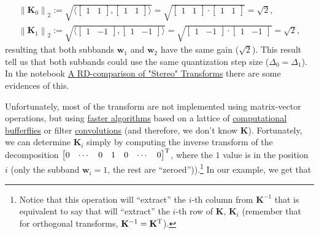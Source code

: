 \begin{equation}
  \begin{array}{l}
    \left\| {\mathbf K}_0 \right\|_2 := \sqrt{\langle \begin{bmatrix}1 & 1\end{bmatrix}, \begin{bmatrix}1 & 1\end{bmatrix} \rangle} = \sqrt{\begin{bmatrix}1 & 1\end{bmatrix} \cdot \begin{bmatrix}1 & 1\end{bmatrix}} = \sqrt{2},\\
    \left\| {\mathbf K}_1 \right\|_2 := \sqrt{\langle \begin{bmatrix}1 & -1\end{bmatrix}, \begin{bmatrix}1 & -1\end{bmatrix} \rangle} = \sqrt{\begin{bmatrix}1 & -1\end{bmatrix}\cdot \begin{bmatrix}1 & -1\end{bmatrix}} = \sqrt{2},
  \end{array}
\end{equation}
resulting that both subbands ${\mathbf w}_1$ and ${\mathbf w}_2$ have
the same gain ($\sqrt{2}$). This result tell us that both subbands
could use the same quantization step size ($\Delta_0=\Delta_1$). In
the notebook
\href{https://github.com/Tecnologias-multimedia/Tecnologias-multimedia.github.io/blob/master/study_guide/transform_coding/stereo_transforms_RD.ipynb}{A
  RD-comparison of "Stereo" Transforms} there are some evidences of
this.

Unfortunately, most of the transform are not implemented using
matrix-vector operations, but using
\href{https://en.wikipedia.org/wiki/Fast_Fourier_transform}{faster
  algorithms} based on a lattice of
\href{https://en.wikipedia.org/wiki/Butterfly_diagram}{computational
  bufferflies} or filter
\href{https://en.wikipedia.org/wiki/Filter_(signal_processing)}{convolutions}
(and therefore, we don't know ${\mathbf K}$). Fortunately, we can
determine ${\mathbf K}_i$ simply by computing the inverse transform of
the decomposition
$\begin{bmatrix} 0 & \cdots & 0 & 1 & 0 & \cdots &
  0 \end{bmatrix}^{\text T}$, where the $1$ value is in the position
$i$ (only the subband ${\mathbf w}_i=1$, the rest are
``zeroed'')).\footnote{Notice that this operation will ``extract'' the
  $i$-th column from ${\mathbf K}^{-1}$ that is equivalent to say that
  will ``extract'' the $i$-th row of ${\mathbf K}$, ${\mathbf K}_i$
  (remember that for orthogonal transforms,
  ${\mathbf K}^{-1}={\mathbf K}^{\text T}$).} In our example, we get
that

